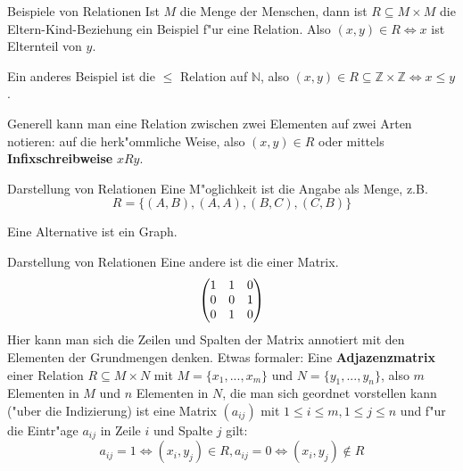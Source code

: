 \documentclass{beamer}
\begin{document}
\begin{frame}{Beispiele von Relationen}  
Ist $M$ die Menge der Menschen, dann ist $R\subseteq M\times M$ die Eltern-Kind-Beziehung ein Beispiel f"ur eine Relation.
Also $(x,y)\in R\Leftrightarrow x$ ist Elternteil von $y$. 

Ein anderes Beispiel ist die $\leq$ Relation auf $\mathbb{N}$, also $(x,y)\in R\subseteq \mathbb{Z}\times\mathbb{Z}\Leftrightarrow x\leq y$.

Generell kann man eine Relation zwischen zwei Elementen auf zwei Arten notieren: auf die herk"ommliche Weise, also $(x,y)\in R$ oder mittels \textbf{Infixschreibweise} $xRy$.
\end{frame}
  

\begin{frame}{Darstellung von Relationen}
  Eine M"oglichkeit ist die Angabe als Menge, z.B. 
  \[R=\{(A,B), (A,A), (B,C), (C,B)\}\]

  Eine Alternative ist ein Graph.




\end{frame}
\begin{frame}{Darstellung von Relationen}
  Eine andere ist die einer Matrix.
  \[
  \begin{pmatrix}
    $1$ & $1$ & $0$ \\
    $0$ & $0$ & $1$ \\
    $0$ & $1$ & $0$
  \end{pmatrix}
  \]
  Hier kann man sich die Zeilen und Spalten der Matrix annotiert mit den Elementen der Grundmengen denken.
  Etwas formaler: Eine \textbf{Adjazenzmatrix} einer Relation $R\subseteq M\times N$ mit $M=\{x_1,...,x_m\}$ und $N=\{y_1,...,y_n\}$, also $m$ Elementen in $M$ und $n$ Elementen in $N$, die man sich geordnet vorstellen kann ("uber die Indizierung) ist eine Matrix $(a_{ij})$ mit $1\leq i\leq m, 1\leq j\leq n$ und f"ur die Eintr"age $a_{ij}$ in Zeile $i$ und Spalte $j$ gilt:
  \[a_{ij}=1\Leftrightarrow (x_i,y_j)\in R, a_{ij}=0\Leftrightarrow (x_i,y_j)\notin R \]
\end{frame}
\end{document}
